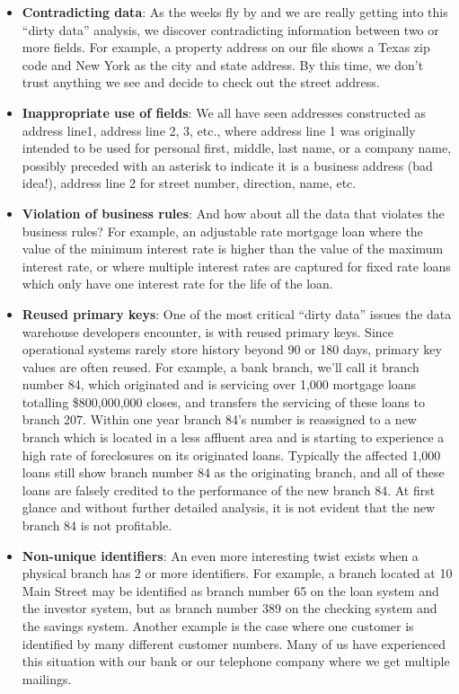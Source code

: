 \documentclass[10pt,a4paper]{article}
\begin{document}
\begin{itemize}
	\item \textbf{Contradicting data}: As the weeks fly by and we are really getting into this “dirty data” analysis, we discover contradicting information between two or more fields. For example, a property address on our file shows a Texas zip code and New York as the city and state address. By this time, we don’t trust anything we see and decide to check out the street address.
	\item \textbf{Inappropriate use of fields}: We all have seen addresses constructed as address line1, address line 2, 3, etc., where address line 1 was originally intended to be used for personal first, middle, last name, or a company name, possibly preceded with an asterisk to indicate it is a business address (bad idea!), address line 2 for street number, direction, name, etc.
	\item \textbf{Violation of business rules}: And how about all the data that violates the business rules? For example, an adjustable rate mortgage loan where the value of the minimum interest rate is higher than the value of the maximum interest rate, or where multiple interest rates are captured for fixed rate loans which only have one interest rate for the life of the loan.
	\item \textbf{Reused primary keys}: One of the most critical “dirty data” issues the data warehouse developers encounter, is with reused primary keys. Since operational systems rarely store history beyond 90 or 180 days, primary key values are often reused. For example, a bank branch, we’ll call it branch number 84, which originated and is servicing over 1,000 mortgage loans totalling \$800,000,000 closes, and transfers the servicing of these loans to branch 207.  Within one year branch 84’s number is reassigned to a new branch which is located in a less affluent area and is starting to experience a high rate of foreclosures on its originated loans. Typically the affected 1,000 loans still show branch number 84 as the originating branch, and all of these loans are falsely credited to the performance of the new branch 84. At first glance and without further detailed analysis, it is not evident that the new branch 84 is not profitable.
	\item \textbf{Non-unique identifiers}: An even more interesting twist exists when a physical branch has 2 or more identifiers. For example, a branch located at 10 Main Street may be identified as branch number 65 on the loan system and the investor system, but as branch number 389 on the checking system and the savings system. Another example is the case where one customer is identified by many different customer numbers. Many of us have experienced this situation with our bank or our telephone company where we get multiple mailings.

\end{itemize}
\end{document}
